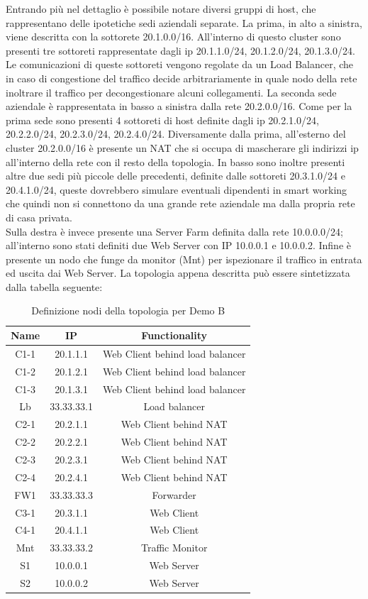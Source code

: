 Entrando più nel dettaglio è possibile notare diversi gruppi di host, che rappresentano delle ipotetiche sedi aziendali separate. La prima, in alto a sinistra, viene descritta con la sottorete 20.1.0.0/16. All'interno di questo cluster sono presenti 
tre sottoreti rappresentate dagli ip 20.1.1.0/24, 20.1.2.0/24, 20.1.3.0/24. Le comunicazioni di queste sottoreti vengono regolate da un Load Balancer, che in caso di congestione del traffico decide arbitrariamente in quale nodo della rete inoltrare il traffico
per decongestionare alcuni collegamenti. La seconda sede aziendale è rappresentata in basso a sinistra dalla rete 20.2.0.0/16. Come per la prima sede sono presenti 4 sottoreti di host definite dagli ip 20.2.1.0/24, 20.2.2.0/24, 20.2.3.0/24, 20.2.4.0/24. Diversamente dalla 
prima, all'esterno del cluster 20.2.0.0/16 è presente un NAT che si occupa di mascherare gli indirizzi ip all'interno della rete con il resto della topologia. In basso sono inoltre presenti altre due sedi più piccole delle precedenti, definite dalle sottoreti 20.3.1.0/24 
e 20.4.1.0/24, queste dovrebbero simulare eventuali dipendenti in smart working che quindi non si connettono da una grande rete aziendale ma dalla propria rete di casa privata.\\
Sulla destra è invece presente una Server Farm definita dalla rete 10.0.0.0/24; all'interno sono stati definiti due Web Server con IP 10.0.0.1 e 10.0.0.2.  Infine è presente un nodo che funge da monitor (Mnt) per ispezionare il traffico in entrata ed uscita dai Web Server.
La topologia appena descritta può essere sintetizzata dalla tabella seguente:
\begin{table}
    \centering
    \begin{tabular}{ccc}
        \hline
         Name & IP & Functionality \\
        \hline
        C1-1 & 20.1.1.1 & Web Client behind load balancer \\
        C1-2 & 20.1.2.1 & Web Client behind load balancer \\
        C1-3 & 20.1.3.1 & Web Client behind load balancer \\
        Lb & 33.33.33.1 & Load balancer \\ 
        C2-1 & 20.2.1.1 & Web Client behind NAT \\
        C2-2 & 20.2.2.1 & Web Client behind NAT \\
        C2-3 & 20.2.3.1 & Web Client behind NAT \\
        C2-4 & 20.2.4.1 & Web Client behind NAT \\
        FW1 & 33.33.33.3 & Forwarder \\
        C3-1 & 20.3.1.1 & Web Client \\
        C4-1 & 20.4.1.1 & Web Client \\
        Mnt & 33.33.33.2 & Traffic Monitor \\
        S1 & 10.0.0.1 & Web Server \\
        S2 & 10.0.0.2 & Web Server \\
        \hline
    \end{tabular}
    \caption{Definizione nodi della topologia per Demo B}
    \label{tab:tabella}
\end{table}


